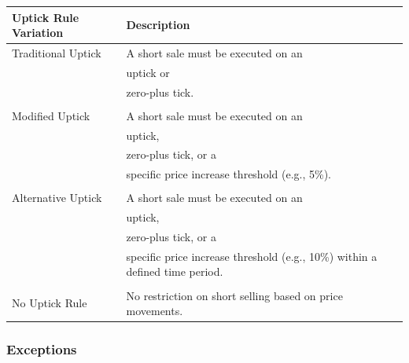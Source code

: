 \documentclass[11pt]{article}
\begin{document}
\begin{center}
\begin{tabular}{ll}
\hline
Uptick Rule Variation & Description\\[0pt]
\hline
Traditional Uptick & A short sale must be executed on an\\[0pt]
 & uptick or\\[0pt]
 & zero-plus tick.\\[0pt]
 & \\[0pt]
Modified Uptick & A short sale must be executed on an\\[0pt]
 & uptick,\\[0pt]
 & zero-plus tick, or a\\[0pt]
 & specific price increase threshold (e.g., 5\%).\\[0pt]
 & \\[0pt]
Alternative Uptick & A short sale must be executed on an\\[0pt]
 & uptick,\\[0pt]
 & zero-plus tick, or a\\[0pt]
 & specific price increase threshold (e.g., 10\%) within a defined time period.\\[0pt]
 & \\[0pt]
No Uptick Rule & No restriction on short selling based on price movements.\\[0pt]
\hline
\end{tabular}
\end{center}


\subsubsection{Exceptions}
\label{sec:org07f8599}
\end{document}
